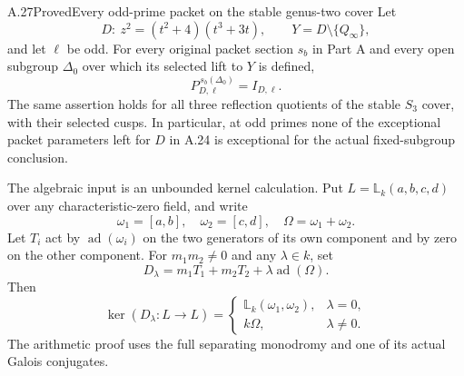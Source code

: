 \begin{statement}{A.27}{Proved}{Every odd-prime packet on the stable genus-two cover}
Let
\[
 D:\ z^2=(t^2+4)(t^3+3t),\qquad
 Y=D\setminus\{Q_\infty\},
\]
and let $\ell$ be odd. For every original packet section $s_b$
in Part A and every open subgroup $\Delta_0$ over which its
selected lift to $Y$ is defined,
\[
                 P_{D,\ell}^{\,s_b(\Delta_0)}=I_{D,\ell}.
                                                        \tag{A.27.1}
\]
The same assertion holds for all three reflection quotients
of the stable $S_3$ cover, with their selected cusps. In
particular, at odd primes none of the exceptional packet
parameters left for $D$ in A.24 is exceptional for the actual
fixed-subgroup conclusion.

The algebraic input is an unbounded kernel calculation.
Put $L=\mathbb L_k(a,b,c,d)$ over any characteristic-zero
field, and write
\[
 \omega_1=[a,b],\quad \omega_2=[c,d],\quad
 \Omega=\omega_1+\omega_2.
\]
Let $T_i$ act by $\operatorname{ad}(\omega_i)$ on the two
generators of its own component and by zero on the other
component. For $m_1m_2\ne0$ and any $\lambda\in k$, set
\[
             D_\lambda=m_1T_1+m_2T_2
                                +\lambda\operatorname{ad}(\Omega).
                                                        \tag{A.27.2}
\]
Then
\[
 \ker(D_\lambda:L\longrightarrow L)=
 \begin{cases}
   \mathbb L_k(\omega_1,\omega_2),&\lambda=0,\\
   k\Omega,&\lambda\ne0.
 \end{cases}                                           \tag{A.27.3}
\]
The arithmetic proof uses the full separating monodromy
and one of its actual Galois conjugates.
\end{statement}
